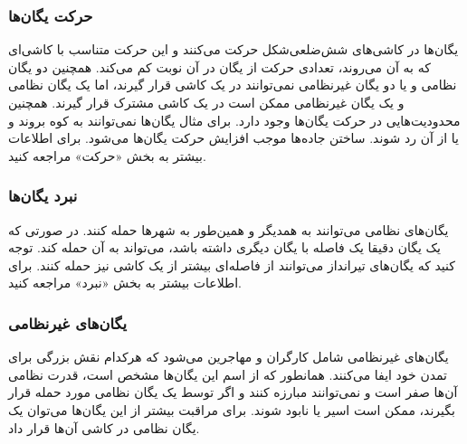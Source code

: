 \documentclass[]{article}
\begin{document}
\subsubsection*{{\titr حرکت یگان‌ها}}
یگان‌ها در کاشی‌های شش‌ضلعی‌شکل حرکت می‌کنند و این حرکت متناسب با کاشی‌ای که به آن می‌روند، تعدادی حرکت از یگان در آن نوبت کم می‌کند. همچنین دو یگان نظامی و یا دو یگان غیرنظامی نمی‌توانند در یک کاشی قرار گیرند، اما یک یگان نظامی و یک یگان غیرنظامی ممکن است در یک کاشی مشترک قرار گیرند. همچنین محدودیت‌هایی در حرکت یگان‌ها وجود دارد. برای مثال یگان‌ها نمی‌توانند به کوه بروند و یا از آن رد شوند. ساختن جاده‌ها موجب افزایش حرکت یگان‌ها می‌شود. برای اطلاعات بیشتر به بخش «حرکت» مراجعه کنید.

\subsubsection*{{\titr نبرد یگان‌ها}}
یگان‌های نظامی می‌توانند به همدیگر و همین‌طور به شهرها حمله کنند. در صورتی که یک یگان دقیقا یک فاصله با یگان دیگری داشته باشد، می‌تواند به آن حمله کند. توجه کنید که یگان‌های تیرانداز می‌توانند از فاصله‌ای بیشتر از یک کاشی نیز حمله کنند.
برای اطلاعات بیشتر به بخش «نبرد» مراجعه کنید.

\subsubsection*{{\titr یگان‌های غیرنظامی}}
یگان‌های غیرنظامی شامل کارگران و مهاجرین می‌شود که هرکدام نقش بزرگی برای تمدن خود ایفا می‌کنند. همانطور که از اسم این یگان‌ها مشخص است، قدرت نظامی آن‌ها صفر است و نمی‌توانند مبارزه کنند و اگر توسط یک یگان نظامی مورد حمله قرار بگیرند، ممکن است اسیر یا نابود شوند. برای مراقبت بیشتر از این یگان‌ها می‌توان یک یگان نظامی در کاشی آن‌ها قرار داد.
\end{document}
